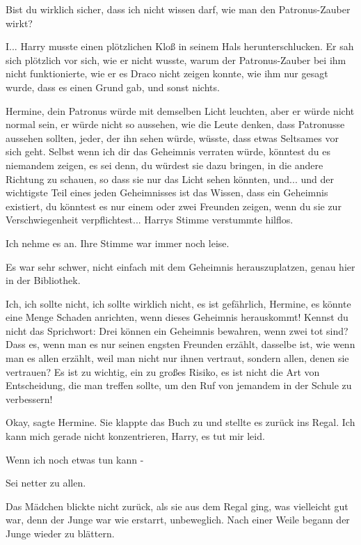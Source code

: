 \glqq{}Bist du wirklich sicher, dass ich nicht wissen darf, wie man den
Patronus-Zauber wirkt?\grqq{}

\glqq{}I...\grqq{} Harry musste einen plötzlichen Kloß in seinem Hals
herunterschlucken. Er sah sich plötzlich vor sich, wie er nicht wusste, warum
der Patronus-Zauber bei ihm nicht funktionierte, wie er es Draco nicht zeigen
konnte, wie ihm nur gesagt wurde, dass es einen Grund gab, und sonst nichts.

\glqq{}Hermine, dein Patronus würde mit demselben Licht leuchten, aber er würde
nicht normal sein, er würde nicht so aussehen, wie die Leute denken, dass
Patronusse aussehen sollten, jeder, der ihn sehen würde, wüsste, dass etwas
Seltsames vor sich geht. Selbst wenn ich dir das Geheimnis verraten würde,
könntest du es niemandem zeigen, es sei denn, du würdest sie dazu bringen, in
die andere Richtung zu schauen, so dass sie nur das Licht sehen könnten, und...
und der wichtigste Teil eines jeden Geheimnisses ist das Wissen, dass ein
Geheimnis existiert, du könntest es nur einem oder zwei Freunden zeigen, wenn du
sie zur Verschwiegenheit verpflichtest...\grqq{} Harrys Stimme verstummte
hilflos.

\glqq{}Ich nehme es an.\grqq{} Ihre Stimme war immer noch leise.

Es war sehr schwer, nicht einfach mit dem Geheimnis herauszuplatzen, genau hier
in der Bibliothek.

\glqq{}Ich, ich sollte nicht, ich sollte wirklich nicht, es ist gefährlich,
Hermine, es könnte eine Menge Schaden anrichten, wenn dieses Geheimnis
herauskommt! Kennst du nicht das Sprichwort: Drei können ein Geheimnis bewahren,
wenn zwei tot sind? Dass es, wenn man es nur seinen engsten Freunden erzählt,
dasselbe ist, wie wenn man es allen erzählt, weil man nicht nur ihnen vertraut,
sondern allen, denen sie vertrauen? Es ist zu wichtig, ein zu großes Risiko, es
ist nicht die Art von Entscheidung, die man treffen sollte, um den Ruf von
jemandem in der Schule zu verbessern!\grqq{}

\glqq{}Okay\grqq{}, sagte Hermine. Sie klappte das Buch zu und stellte es zurück
ins Regal. \glqq{}Ich kann mich gerade nicht konzentrieren, Harry, es tut mir
leid.\grqq{}

\glqq{}Wenn ich noch etwas tun kann -\grqq{}

\glqq{}Sei netter zu allen.\grqq{}

Das Mädchen blickte nicht zurück, als sie aus dem Regal ging, was vielleicht gut
war, denn der Junge war wie erstarrt, unbeweglich. Nach einer Weile begann der
Junge wieder zu blättern.


